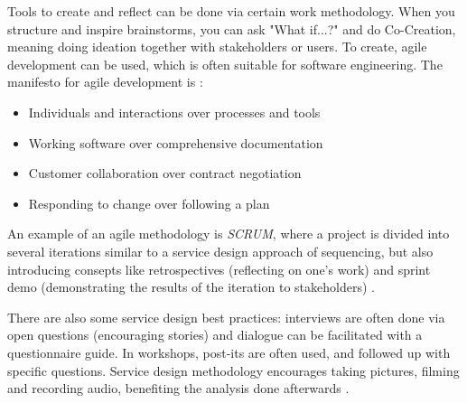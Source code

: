 Tools to create and reflect can be done via certain work methodology. When you structure and inspire brainstorms, you can ask "What if...?" and do Co-Creation, meaning doing ideation together with stakeholders or users. To create, agile development can be used, which is often suitable for software engineering. The manifesto for agile development is \citep{agile-manifesto}:

\begin{itemize}
\item Individuals and interactions over processes and tools
\item Working software over comprehensive documentation
\item Customer collaboration over contract negotiation
\item Responding to change over following a plan
\end{itemize}

An example of an agile methodology is \textit{SCRUM}, where a project is divided into several iterations similar to a service design approach of sequencing, but also introducing consepts like retrospectives (reflecting on one's work) and sprint demo (demonstrating the results of the iteration to stakeholders) \citep{kniberg}.

There are also some service design best practices: interviews are often done via open questions (encouraging stories) and dialogue can be facilitated with a questionnaire guide. In workshops, post-its are often used, and followed up with specific questions. Service design methodology encourages taking pictures, filming and recording audio, benefiting the analysis done afterwards \citep{expedition-mondial}.

%


%

%
